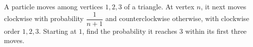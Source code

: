 A particle moves among vertices $1,2,3$ of a triangle. At vertex $n$, it next moves clockwise with probability $\dfrac{1}{n+1}$ and counterclockwise otherwise, with clockwise order $1,2,3$. Starting at $1$, find the probability it reaches $3$ within its first three moves.

